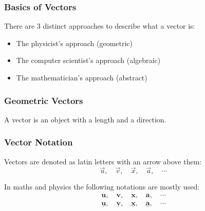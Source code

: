 
\begin{frame}
  \frametitle{Basics of Vectors}
  There are 3 distinct approaches to describe what a vector is:
  \begin{itemize}
  \item The physicist's approach (geometric)
  \item The computer scientist's approach (algebraic)
  \item The mathematician's approach (abstract)
  \end{itemize}
\end{frame}

\begin{frame}
  \frametitle{Geometric Vectors}
  \begin{presentation_definition}
  A vector is an object with a length and a direction.
  \end{presentation_definition}

  \begin{figure}[H]
  \centering
  \end{figure}
\end{frame}

\begin{frame}
  \frametitle{Vector Notation}
  Vectors are denoted as latin letters with an arrow above them:
  \begin{equation*}
  \vec{u},\quad\vec{v},\quad\vec{x},\quad\vec{a},\quad\cdots
  \end{equation*}

  In maths and physics the following notations are mostly used:
  \begin{align*}
  \bm{u},\quad\bm{v},\quad\bm{x},\quad\bm{a},\quad\cdots\\
  \underline{\bm{u}},\quad\underline{\bm{v}},\quad\underline{\bm{x}},\quad\underline{\bm{a}},\quad\cdots\\
  \end{align*}
\end{frame}

